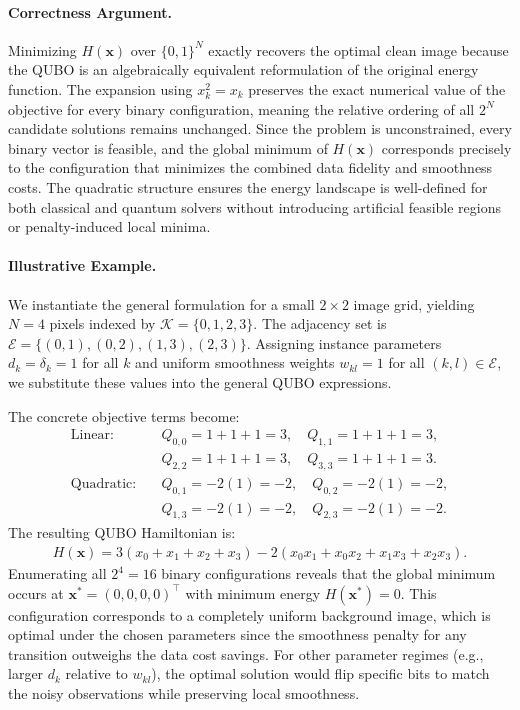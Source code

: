 \documentclass[12pt]{article}
\begin{document}
\paragraph{Correctness Argument.}
Minimizing $H(\mathbf{x})$ over $\{0,1\}^N$ exactly recovers the optimal clean image because the QUBO is an algebraically equivalent reformulation of the original energy function. The expansion using $x_k^2 = x_k$ preserves the exact numerical value of the objective for every binary configuration, meaning the relative ordering of all $2^N$ candidate solutions remains unchanged. Since the problem is unconstrained, every binary vector is feasible, and the global minimum of $H(\mathbf{x})$ corresponds precisely to the configuration that minimizes the combined data fidelity and smoothness costs. The quadratic structure ensures the energy landscape is well-defined for both classical and quantum solvers without introducing artificial feasible regions or penalty-induced local minima.

\paragraph{Illustrative Example.}
We instantiate the general formulation for a small $2 \times 2$ image grid, yielding $N = 4$ pixels indexed by $\mathcal{K} = \{0, 1, 2, 3\}$. The adjacency set is $\mathcal{E} = \{(0,1), (0,2), (1,3), (2,3)\}$. Assigning instance parameters $d_k = \delta_k = 1$ for all $k$ and uniform smoothness weights $w_{kl} = 1$ for all $(k,l) \in \mathcal{E}$, we substitute these values into the general QUBO expressions.

The concrete objective terms become:
\begin{align}
\text{Linear:} \quad & Q_{0,0} = 1 + 1 + 1 = 3, \quad Q_{1,1} = 1 + 1 + 1 = 3, \\
& Q_{2,2} = 1 + 1 + 1 = 3, \quad Q_{3,3} = 1 + 1 + 1 = 3. \\
\text{Quadratic:} \quad & Q_{0,1} = -2(1) = -2, \quad Q_{0,2} = -2(1) = -2, \\
& Q_{1,3} = -2(1) = -2, \quad Q_{2,3} = -2(1) = -2.
\end{align}
The resulting QUBO Hamiltonian is:
\begin{align}
H(\mathbf{x}) = 3(x_0 + x_1 + x_2 + x_3) - 2(x_0 x_1 + x_0 x_2 + x_1 x_3 + x_2 x_3).
\end{align}
Enumerating all $2^4 = 16$ binary configurations reveals that the global minimum occurs at $\mathbf{x}^* = (0,0,0,0)^\top$ with minimum energy $H(\mathbf{x}^*) = 0$. This configuration corresponds to a completely uniform background image, which is optimal under the chosen parameters since the smoothness penalty for any transition outweighs the data cost savings. For other parameter regimes (e.g., larger $d_k$ relative to $w_{kl}$), the optimal solution would flip specific bits to match the noisy observations while preserving local smoothness.
\end{document}

